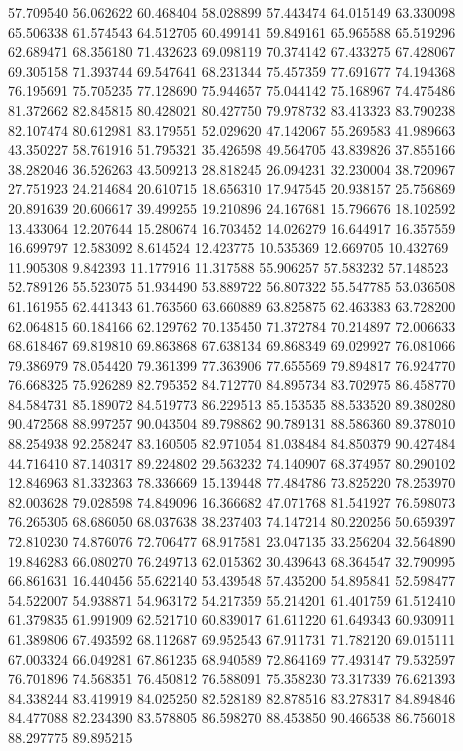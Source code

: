 57.709540
56.062622
60.468404
58.028899
57.443474
64.015149
63.330098
65.506338
61.574543
64.512705
60.499141
59.849161
65.965588
65.519296
62.689471
68.356180
71.432623
69.098119
70.374142
67.433275
67.428067
69.305158
71.393744
69.547641
68.231344
75.457359
77.691677
74.194368
76.195691
75.705235
77.128690
75.944657
75.044142
75.168967
74.475486
81.372662
82.845815
80.428021
80.427750
79.978732
83.413323
83.790238
82.107474
80.612981
83.179551
52.029620
47.142067
55.269583
41.989663
43.350227
58.761916
51.795321
35.426598
49.564705
43.839826
37.855166
38.282046
36.526263
43.509213
28.818245
26.094231
32.230004
38.720967
27.751923
24.214684
20.610715
18.656310
17.947545
20.938157
25.756869
20.891639
20.606617
39.499255
19.210896
24.167681
15.796676
18.102592
13.433064
12.207644
15.280674
16.703452
14.026279
16.644917
16.357559
16.699797
12.583092
8.614524
12.423775
10.535369
12.669705
10.432769
11.905308
9.842393
11.177916
11.317588
55.906257
57.583232
57.148523
52.789126
55.523075
51.934490
53.889722
56.807322
55.547785
53.036508
61.161955
62.441343
61.763560
63.660889
63.825875
62.463383
63.728200
62.064815
60.184166
62.129762
70.135450
71.372784
70.214897
72.006633
68.618467
69.819810
69.863868
67.638134
69.868349
69.029927
76.081066
79.386979
78.054420
79.361399
77.363906
77.655569
79.894817
76.924770
76.668325
75.926289
82.795352
84.712770
84.895734
83.702975
86.458770
84.584731
85.189072
84.519773
86.229513
85.153535
88.533520
89.380280
90.472568
88.997257
90.043504
89.798862
90.789131
88.586360
89.378010
88.254938
92.258247
83.160505
82.971054
81.038484
84.850379
90.427484
44.716410
87.140317
89.224802
29.563232
74.140907
68.374957
80.290102
12.846963
81.332363
78.336669
15.139448
77.484786
73.825220
78.253970
82.003628
79.028598
74.849096
16.366682
47.071768
81.541927
76.598073
76.265305
68.686050
68.037638
38.237403
74.147214
80.220256
50.659397
72.810230
74.876076
72.706477
68.917581
23.047135
33.256204
32.564890
19.846283
66.080270
76.249713
62.015362
30.439643
68.364547
32.790995
66.861631
16.440456
55.622140
53.439548
57.435200
54.895841
52.598477
54.522007
54.938871
54.963172
54.217359
55.214201
61.401759
61.512410
61.379835
61.991909
62.521710
60.839017
61.611220
61.649343
60.930911
61.389806
67.493592
68.112687
69.952543
67.911731
71.782120
69.015111
67.003324
66.049281
67.861235
68.940589
72.864169
77.493147
79.532597
76.701896
74.568351
76.450812
76.588091
75.358230
73.317339
76.621393
84.338244
83.419919
84.025250
82.528189
82.878516
83.278317
84.894846
84.477088
82.234390
83.578805
86.598270
88.453850
90.466538
86.756018
88.297775
89.895215
